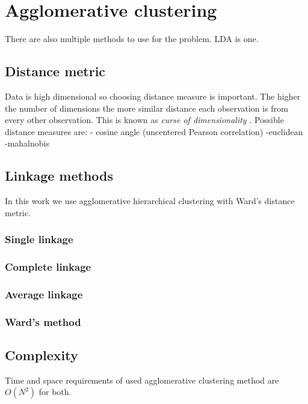\section{Agglomerative clustering}
\label{sec:agglomerativeclustering}
There are also multiple methods to use for the problem. LDA is one.

\subsection{Distance metric}
Data is high dimensional so choosing distance measure is 
important. The higher the number of dimensions the more similar 
distance each observation is from every other observation. This is
known as \emph{curse of dimensionality} .
Possible distance measures are:
- cosine angle (uncentered Pearson correlation)
-euclidean
-mahalnobis

\subsection{Linkage methods}
In this work we use agglomerative hierarchical clustering with 
Ward's distance metric.

\subsubsection{Single linkage}
\subsubsection{Complete linkage}
\subsubsection{Average linkage}
\subsubsection{Ward's method}

\subsection{Complexity}
Time and space requirements of used agglomerative clustering method
are $O(N^2)$ for both.


